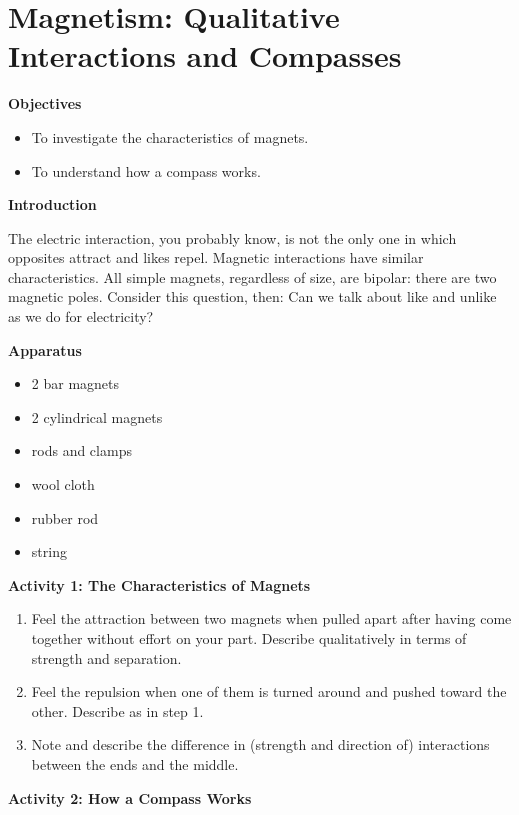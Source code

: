 
\section{Magnetism: Qualitative Interactions and Compasses}

\makelabheader %

\textbf{Objectives}

\begin{itemize}
\item To investigate the characteristics of magnets.
\item To understand how a compass works.
\end{itemize}
\textbf{Introduction} 

The electric interaction, you probably know, is not the only one in
which opposites attract and likes repel. Magnetic interactions have
similar characteristics. All simple magnets, regardless of size, are
bipolar: there are two magnetic poles. Consider this question, then:
Can we talk about like and unlike as we do for electricity?

\textbf{Apparatus}

\begin{itemize}
\item 2 bar magnets 
\item 2 cylindrical magnets 
\item rods and clamps
\item wool cloth
\item rubber rod
\item string
\end{itemize}
\textbf{Activity 1: The Characteristics of Magnets}

\begin{enumerate}
\item Feel the attraction between two magnets when pulled apart after having
come together without effort on your part. Describe qualitatively
in terms of strength and separation.\vspace{15mm}

\item Feel the repulsion when one of them is turned around and pushed toward
the other. Describe as in step 1.\vspace{15mm}

\item Note and describe the difference in (strength and direction of) interactions
between the ends and the middle.\vspace{15mm}

\end{enumerate}
\textbf{Activity 2: How a Compass Works}

